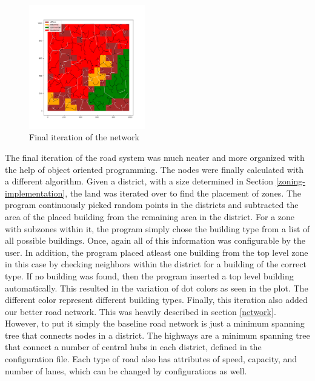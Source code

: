 \documentclass[11pt]{article}
\begin{document}
\begin{multicols}{2}
    \begin{figure}[H]
        \centering
        \includegraphics[width=0.45\textwidth]{images/finalnetwork.png}
        \caption{Final iteration of the network}
        \label{fig:final-network}
    \end{figure}

    \quad The final iteration of the road system was much neater and more organized with the help of object oriented programming. The nodes were finally calculated with a different algorithm. Given a district, with a size determined in Section \ref{zoning-implementation}, the land was iterated over to find the placement of zones. The program continuously picked random points in the districts and subtracted the area of the placed building from the remaining area in the district. For a zone with subzones within it, the program simply chose the building type from a list of all possible buildings. Once, again all of this information was configurable by the user. In addition, the program placed atleast one building from the top level zone in this case by checking neighbors within the district for a building of the correct type. If no building was found, then the program inserted a top level building automatically. This resulted in the variation of dot colors as seen in the plot. The different color represent different building types. Finally, this iteration also added our better road network. This was heavily described in section \ref{network}. However, to put it simply the baseline road network is just a minimum spanning tree that connects nodes in a district. The highways are a minimum spanning tree that connect a number of central hubs in each district, defined in the configuration file. Each type of road also has attributes of speed, capacity, and number of lanes, which can be changed by configurations as well. 


\end{multicols}
\end{document}
